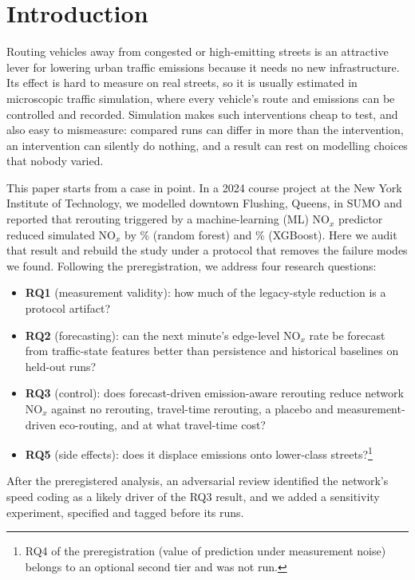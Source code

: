\documentclass[conference]{IEEEtran}
\begin{document}
\section{Introduction}
Routing vehicles away from congested or high-emitting streets is an attractive lever for lowering urban traffic
emissions because it needs no new infrastructure. Its effect is hard to measure on real streets, so it is usually
estimated in microscopic traffic simulation, where every vehicle's route and emissions can be controlled and
recorded. Simulation makes such interventions cheap to test, and also easy to mismeasure: compared runs can differ in
more than the intervention, an intervention can silently do nothing, and a result can rest on modelling choices that
nobody varied.

This paper starts from a case in point. In a 2024 course project at the New York Institute of Technology, we modelled
downtown Flushing, Queens, in SUMO and reported that rerouting triggered by a machine-learning (ML) NO$_x$ predictor
reduced simulated NO$_x$ by \LegacyNOxDropRF\% (random forest) and \LegacyNOxDropXGB\% (XGBoost). Here we audit that
result and rebuild the study under a protocol that removes the failure modes we found. Following the preregistration,
we address four research questions:
\begin{itemize}
\item \textbf{RQ1} (measurement validity): how much of the legacy-style reduction is a protocol artifact?
\item \textbf{RQ2} (forecasting): can the next minute's edge-level NO$_x$ rate be forecast from traffic-state
features better than persistence and historical baselines on held-out runs?
\item \textbf{RQ3} (control): does forecast-driven emission-aware rerouting reduce network NO$_x$ against no
rerouting, travel-time rerouting, a placebo and measurement-driven eco-routing, and at what travel-time cost?
\item \textbf{RQ5} (side effects): does it displace emissions onto lower-class streets?\footnote{RQ4 of the
preregistration (value of prediction under measurement noise) belongs to an optional second tier and was not run.}
\end{itemize}
After the preregistered analysis, an adversarial review identified the network's speed coding as a likely driver of
the RQ3 result, and we added a sensitivity experiment, specified and tagged before its runs.
\end{document}
